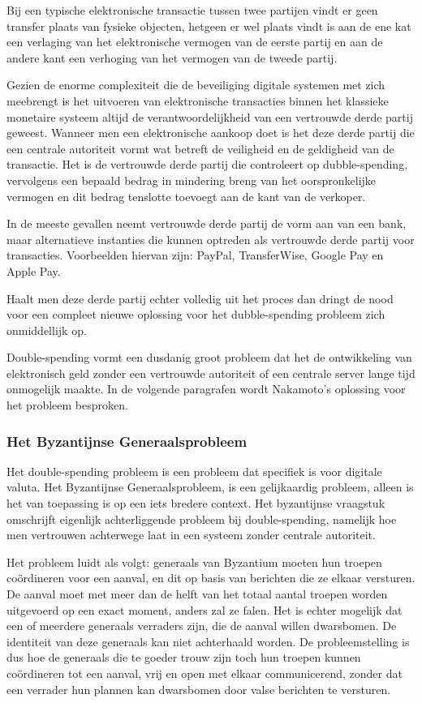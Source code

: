 			Bij een typische elektronische transactie tussen twee partijen vindt er geen transfer plaats van fysieke objecten, hetgeen er wel plaats vindt is aan de ene kat een verlaging van het elektronische vermogen van de eerste partij en aan de andere kant een verhoging van het vermogen van de tweede partij. 
		
			Gezien de enorme complexiteit die de beveiliging digitale systemen met zich meebrengt is het uitvoeren van elektronische transacties binnen het klassieke monetaire systeem altijd de verantwoordelijkheid van een vertrouwde derde partij geweest. Wanneer men een elektronische aankoop doet is het deze derde partij die een centrale autoriteit vormt wat betreft de veiligheid en de geldigheid van de transactie. Het is de vertrouwde derde partij die controleert op dubble-spending, vervolgens een bepaald bedrag in mindering breng van het oorspronkelijke vermogen en dit bedrag tenslotte toevoegt aan de kant van de verkoper. 
			
			In de meeste gevallen neemt vertrouwde derde partij de vorm aan van een bank, maar alternatieve instanties die kunnen optreden als vertrouwde derde partij voor transacties. Voorbeelden hiervan zijn: PayPal, TransferWise, Google Pay en Apple Pay.
		
			Haalt men deze derde partij echter volledig uit het proces dan dringt de nood voor een compleet nieuwe oplossing voor het dubble-spending probleem zich onmiddellijk op.
			
			Double-spending vormt een dusdanig groot probleem dat het de ontwikkeling van elektronisch geld zonder een vertrouwde autoriteit of een centrale server lange tijd onmogelijk maakte. In de volgende paragrafen wordt Nakamoto’s oplossing voor het probleem besproken. 
			
			\subsubsection{Het Byzantijnse Generaalsprobleem}
			Het double-spending probleem is een probleem dat specifiek is voor digitale valuta. Het Byzantijnse Generaalsprobleem, is een gelijkaardig probleem, alleen is het van toepassing is op een iets bredere context. Het byzantijnse vraagstuk omschrijft eigenlijk achterliggende probleem bij double-spending, namelijk hoe men vertrouwen achterwege laat in een systeem zonder centrale autoriteit.
			
			Het probleem luidt als volgt: generaals van Byzantium moeten hun troepen coördineren voor een aanval, en dit op basis van berichten die ze elkaar versturen. De aanval moet met meer dan de helft van het totaal aantal troepen worden uitgevoerd op een exact moment, anders zal ze falen. Het is echter mogelijk dat een of meerdere generaals verraders zijn, die de aanval willen dwarsbomen. De identiteit van deze generaals kan niet achterhaald worden. De probleemstelling is dus hoe de generaals die te goeder trouw zijn toch hun troepen kunnen coördineren tot een aanval, vrij en open met elkaar communicerend, zonder dat een verrader hun plannen kan dwarsbomen door valse berichten te versturen.
			
